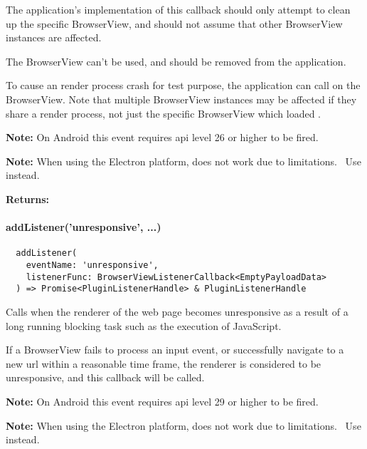 The application's implementation of this callback should only attempt to clean up the specific BrowserView,
and should not assume that other BrowserView instances are affected.

The BrowserView can't be used, and should be removed from the application.

To cause an render process crash for test purpose, the application can
call  on the BrowserView.
Note that multiple BrowserView instances may be affected if they share a render process,
not just the specific BrowserView which loaded .

\textbf{Note:} On Android this event requires \ac{api} level 26 or higher to be fired.~\cite{android:api}

\textbf{Note:} When using the Electron platform,  does not work due to limitations.~\cite{capacitor-electron}
Use  instead.

\textbf{Returns:} 


\newpage

\paragraph{addListener('unresponsive', ...)}

\begin{verbatim}
  addListener(
    eventName: 'unresponsive',
    listenerFunc: BrowserViewListenerCallback<EmptyPayloadData>
  ) => Promise<PluginListenerHandle> & PluginListenerHandle
\end{verbatim}

Calls  when the renderer of the web page becomes unresponsive as a result
of a long running blocking task such as the execution of JavaScript.

If a BrowserView fails to process an input event, or successfully navigate to a new \ac{url} within a reasonable time frame,
the renderer is considered to be unresponsive, and this callback will be called.

\textbf{Note:} On Android this event requires \ac{api} level 29 or higher to be fired.~\cite{android:api}

\textbf{Note:} When using the Electron platform,  does not work due to limitations.~\cite{capacitor-electron}
Use  instead.

